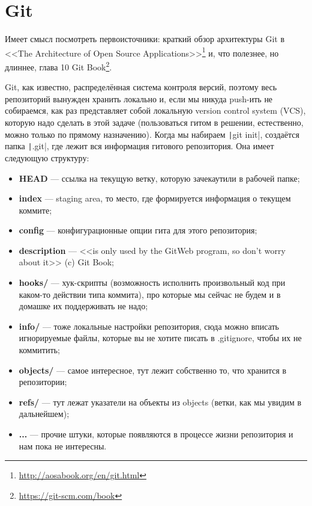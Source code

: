 \documentclass{../../text-style}
\begin{document}
\maketitle
\thispagestyle{empty}

\section{Git}

Имеет смысл посмотреть первоисточники: краткий обзор архитектуры Git в <<The Architecture of Open Source Applications>>\footnote{\url{http://aosabook.org/en/git.html}} и, что полезнее, но длиннее, глава 10 Git Book\footnote{\url{https://git-scm.com/book}}. 

Git, как известно, распределённая система контроля версий, поэтому весь репозиторий вынужден хранить локально и, если мы никуда push-ить не собираемся, как раз представляет собой локальную version control system (VCS), которую надо сделать в этой задаче (пользоваться гитом в решении, естественно, можно только по прямому назначению). Когда мы набираем \texttt|git init|, создаётся папка \texttt|.git|, где лежит вся информация гитового репозитория. Она имеет следующую структуру:

\begin{itemize}
	\item \textbf{HEAD} --- ссылка на текущую ветку, которую зачекаутили в рабочей папке;
	\item \textbf{index} --- staging area, то место, где формируется информация о текущем коммите;
	\item \textbf{config} --- конфигурационные опции гита для этого репозитория;
	\item \textbf{description} --- <<is only used by the GitWeb program, so don’t worry about it>> (c) Git Book;
	\item \textbf{hooks/} --- хук-скрипты (возможность исполнить произвольный код при каком-то действии типа коммита), про которые мы сейчас не будем и в домашке их поддерживать не надо;
	\item \textbf{info/} --- тоже локальные настройки репозитория, сюда можно вписать игнорируемые файлы, которые вы не хотите писать в .gitignore, чтобы их не коммитить;
	\item \textbf{objects/} --- самое интересное, тут лежит собственно то, что хранится в репозитории;
	\item \textbf{refs/} --- тут лежат указатели на объекты из objects (ветки, как мы увидим в дальнейшем);
	\item \textbf{...} --- прочие штуки, которые появляются в процессе жизни репозитория и нам пока не интересны.
\end{itemize}
\end{document}
